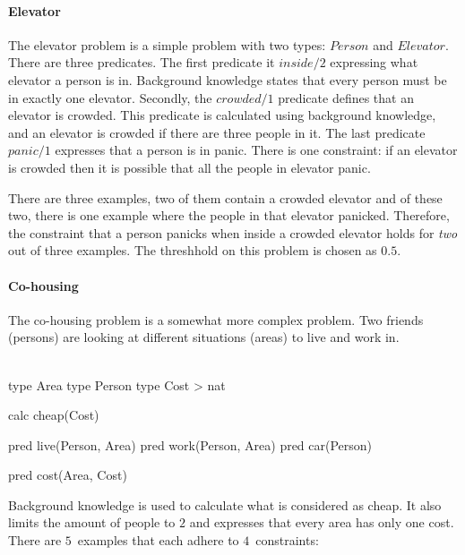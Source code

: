 \paragraph{Elevator}
The elevator problem is a simple problem with two types: $\mathit{Person}$ and $\mathit{Elevator}$.
There are three predicates.
The first predicate it $\mathit{inside}/2$ expressing what elevator a person is in.
Background knowledge states that every person must be in exactly one elevator.
Secondly, the $\mathit{crowded}/1$ predicate defines that an elevator is crowded.
This predicate is calculated using background knowledge, and an elevator is crowded if there are three people in it.
The last predicate $\mathit{panic}/1$ expresses that a person is in panic.
There is one constraint: if an elevator is crowded then it is possible that all the people in elevator panic.

There are three examples, two of them contain a crowded elevator and of these two, there is one example where the people in that elevator panicked.
Therefore, the constraint that a person panicks when inside a crowded elevator holds for \emph{two} out of three examples.
The threshhold on this problem is chosen as $0.5$.

\paragraph{Co-housing}
The co-housing problem is a somewhat more complex problem.
Two friends (persons) are looking at different situations (areas) to live and work in.
\\\\
\begin{minipage}{0.5\textwidth}
	\begin{verbatim*}
		type Area
		type Person
		type Cost > nat

		calc cheap(Cost)
	\end{verbatim*}
\end{minipage}
\begin{minipage}{0.5\textwidth}
	\begin{verbatim*}
		pred live(Person, Area)
		pred work(Person, Area)
		pred car(Person)

		pred cost(Area, Cost)
	\end{verbatim*}
\end{minipage}

Background knowledge is used to calculate what is considered as cheap.
It also limits the amount of people to $2$ and expresses that every area has only one cost.
There are $5$~examples that each adhere to $4$~constraints:

